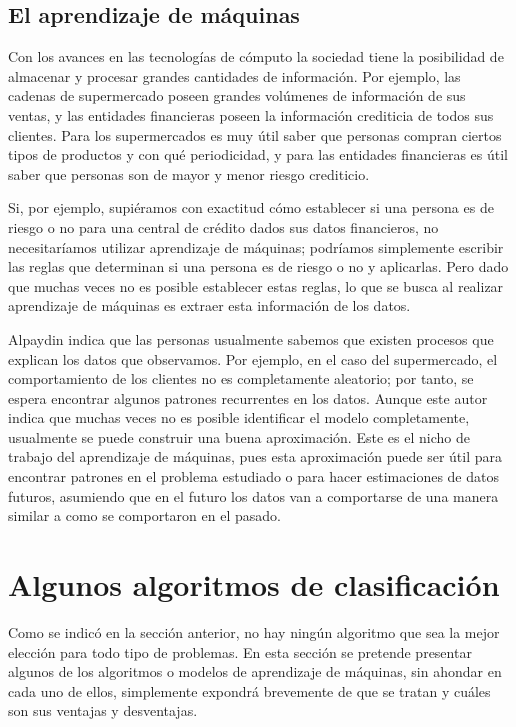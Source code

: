 \documentclass[a4paper, 11pt, oneside]{report}
\begin{document}
\subsection{El aprendizaje de máquinas}
\label{sect:machineLearning}

Con los avances en las tecnologías de cómputo la sociedad tiene la posibilidad de almacenar y procesar grandes cantidades de información. Por ejemplo, las cadenas de supermercado poseen grandes volúmenes de información de sus ventas, y las entidades financieras poseen la información crediticia de todos sus clientes. Para los supermercados es muy útil saber que personas compran ciertos tipos de productos y con qué periodicidad, y para las entidades financieras es útil saber que personas son de mayor y menor riesgo crediticio.

Si, por ejemplo, supiéramos con exactitud cómo establecer si una persona es de riesgo o no para una central de crédito dados sus datos financieros, no necesitaríamos utilizar
aprendizaje de máquinas; podríamos simplemente escribir las reglas que determinan si una persona es de riesgo o no y aplicarlas. Pero dado que muchas veces no es posible establecer estas reglas, lo que se busca al realizar aprendizaje de máquinas es extraer esta información de los datos.

Alpaydin indica que las personas usualmente sabemos que existen procesos que explican los datos que observamos. Por ejemplo, en el caso del supermercado, el comportamiento de los clientes no es completamente aleatorio; por tanto, se espera encontrar algunos patrones recurrentes en los datos. Aunque este autor indica que muchas veces no es posible identificar el modelo completamente, usualmente se puede construir una buena aproximación. Este es el nicho de trabajo del aprendizaje de máquinas, pues esta aproximación puede ser útil para encontrar patrones en el problema estudiado o para hacer estimaciones de datos futuros, asumiendo que en el futuro los datos van a comportarse de una manera similar a como se comportaron en el pasado.

\section{Algunos algoritmos de clasificación}

Como se indicó en la sección anterior, no hay ningún algoritmo que sea la mejor elección para todo tipo de problemas. En esta sección se pretende presentar algunos de los algoritmos o modelos de aprendizaje de máquinas, sin ahondar en cada uno de ellos, simplemente expondrá brevemente de que se tratan y cuáles son sus ventajas y desventajas.
\end{document}

